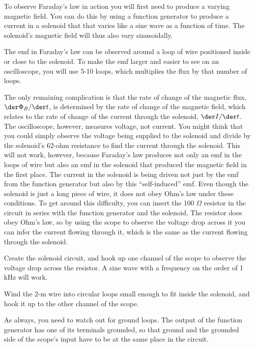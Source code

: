 \observations


To observe Faraday's law in action you will first need to
produce a varying magnetic field. You can do this by using a
function generator to produce a current in a solenoid that
that varies like a sine wave as a function of time. The
solenoid's magnetic field will thus also vary sinusoidally.

The emf  in Faraday's law can be observed around a loop of
wire positioned inside or close to the solenoid. To make the
emf larger and easier to see on an oscilloscope, you will
use 5-10 loops, which multiplies the flux by that number of
loops.

The only remaining complication is that the rate of change
of the magnetic flux, $\der \Phi_B/\der t$,
is determined by the rate of change
of the magnetic field, which relates to the rate of change
of the current through the solenoid, $\der I/\der t$. The oscilloscope,
however, measures voltage, not current. You might think that
you could simply observe the voltage being supplied to the
solenoid and divide by the solenoid's 62-ohm resistance to
find the current through the solenoid. This will not work,
however, because Faraday's law produces not only an emf in
the loops of wire but also an emf in the solenoid that
produced the magnetic field in the first place. The current
in the solenoid is being driven not just by the emf from the
function generator but also by this ``self-induced'' emf.
Even though the solenoid is just a long piece of wire, it
does not obey Ohm's law under these conditions. To get
around this difficulty, you can insert the 100 $\Omega$
resistor in the circuit in series with the function
generator and the solenoid. The resistor does obey Ohm's law, so by
using the scope to observe the voltage drop across it you
can infer the current flowing through it, which is the same
as the current flowing through the solenoid.

Create the solenoid circuit, and hook up one channel of the
scope to observe the voltage drop across the  resistor.
A sine wave with a frequency on the order of 1 kHz will work.

Wind the 2-m wire into circular loops small enough to fit
inside the solenoid, and hook it up to the other channel of the scope.


As always, you need to watch out for ground loops. The output
of the function generator has one of its terminals grounded,
so that ground and the grounded side of the scope's input have
to be at the same place in the circuit.


